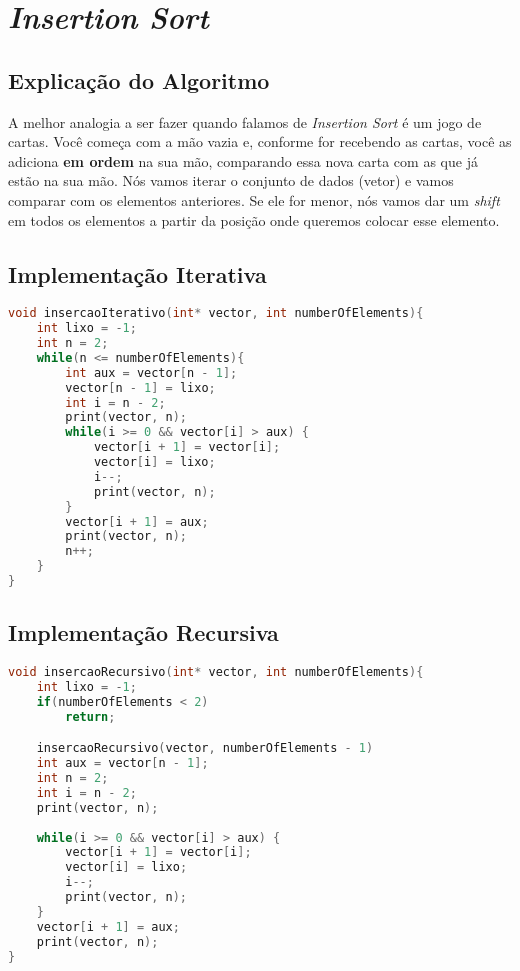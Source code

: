 \section{\textit{Insertion Sort}}

\subsection{Explicação do Algoritmo}
A melhor analogia a ser fazer quando falamos de \textit{Insertion Sort} é um jogo de cartas. Você começa com a mão vazia e, conforme for recebendo as cartas, você as adiciona
\textbf{em ordem} na sua mão, comparando essa nova carta com as que já estão na sua mão. Nós vamos iterar o conjunto de dados (vetor) e vamos comparar com os elementos anteriores.
Se ele for menor, nós vamos dar um \textit{shift} em todos os elementos a partir da posição onde queremos colocar esse elemento.

\subsection{Implementação Iterativa}
\begin{lstlisting}[language=C]
void insercaoIterativo(int* vector, int numberOfElements){
    int lixo = -1;
    int n = 2;
    while(n <= numberOfElements){
        int aux = vector[n - 1];
        vector[n - 1] = lixo;
        int i = n - 2;
        print(vector, n);
        while(i >= 0 && vector[i] > aux) {
            vector[i + 1] = vector[i];
            vector[i] = lixo;
            i--;
            print(vector, n);
        }
        vector[i + 1] = aux;
        print(vector, n);
        n++;
    }
}

\end{lstlisting}

\subsection{Implementação Recursiva}
\begin{lstlisting}[language=C]
void insercaoRecursivo(int* vector, int numberOfElements){
    int lixo = -1;
    if(numberOfElements < 2)
        return;

    insercaoRecursivo(vector, numberOfElements - 1)
    int aux = vector[n - 1];
    int n = 2;
    int i = n - 2;
    print(vector, n);
    
    while(i >= 0 && vector[i] > aux) {
        vector[i + 1] = vector[i];
        vector[i] = lixo;
        i--;
        print(vector, n);
    }
    vector[i + 1] = aux;
    print(vector, n);
}
\end{lstlisting}
